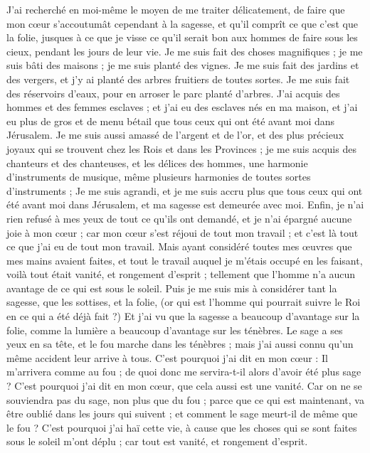 \begin{multicols}{2}
J'ai recherché en moi-même le moyen de me traiter délicatement, de faire que mon cœur s'accoutumât cependant à la sagesse, et qu'il comprît ce que c'est que la folie, jusques à ce que je visse ce qu'il serait bon aux hommes de faire sous les cieux, pendant les jours de leur vie.
Je me suis fait des choses magnifiques ; je me suis bâti des maisons ; je me suis planté des vignes.
Je me suis fait des jardins et des vergers, et j'y ai planté des arbres fruitiers de toutes sortes.
Je me suis fait des réservoirs d'eaux, pour en arroser le parc planté d'arbres.
J'ai acquis des hommes et des femmes esclaves ; et j'ai eu des esclaves nés en ma maison, et j'ai eu plus de gros et de menu bétail que tous ceux qui ont été avant moi dans Jérusalem.
Je me suis aussi amassé de l'argent et de l'or, et des plus précieux joyaux qui se trouvent chez les Rois et dans les Provinces ; je me suis acquis des chanteurs et des chanteuses, et les délices des hommes, une harmonie d'instruments de musique, même plusieurs harmonies de toutes sortes d'instruments ;
Je me suis agrandi, et je me suis accru plus que tous ceux qui ont été avant moi dans Jérusalem, et ma sagesse est demeurée avec moi.
Enfin, je n'ai rien refusé à mes yeux de tout ce qu'ils ont demandé, et je n'ai épargné aucune joie à mon cœur ; car mon cœur s'est réjoui de tout mon travail ; et c'est là tout ce que j'ai eu de tout mon travail.
Mais ayant considéré toutes mes œuvres que mes mains avaient faites, et tout le travail auquel je m'étais occupé en les faisant, voilà tout était vanité, et rongement d'esprit ; tellement que l'homme n'a aucun avantage de ce qui est sous le soleil.
Puis je me suis mis à considérer tant la sagesse, que les sottises, et la folie, (or qui est l'homme qui pourrait suivre le Roi en ce qui a été déjà fait ?)
Et j'ai vu que la sagesse a beaucoup d'avantage sur la folie, comme la lumière a beaucoup d'avantage sur les ténèbres.
Le sage a ses yeux en sa tête, et le fou marche dans les ténèbres ; mais j'ai aussi connu qu'un même accident leur arrive à tous.
C'est pourquoi j'ai dit en mon cœur : Il m'arrivera comme au fou ; de quoi donc me servira-t-il alors d'avoir été plus sage ? C'est pourquoi j'ai dit en mon cœur, que cela aussi est une vanité.
Car on ne se souviendra pas du sage, non plus que du fou ; parce que ce qui est maintenant, va être oublié dans les jours qui suivent ; et comment le sage meurt-il de même que le fou ?
C'est pourquoi j'ai haï cette vie, à cause que les choses qui se sont faites sous le soleil m'ont déplu ; car tout est vanité, et rongement d'esprit.

\end{multicols}
